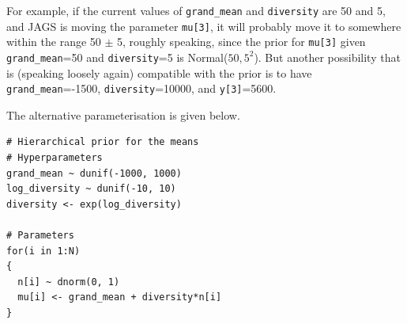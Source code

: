 For example, if the current values of {\tt grand\_mean} and {\tt diversity}
are 50 and 5, and JAGS is moving the parameter {\tt mu[3]}, it will probably
move it to somewhere within the range 50 $\pm$ 5, roughly speaking, since
the prior for {\tt mu[3]} given {\tt grand\_mean}=50 and {\tt diversity}=5
is Normal($50, 5^2$). But another possibility that is (speaking loosely again)
compatible with the prior is to have {\tt grand\_mean}=-1500,
{\tt diversity}=10000, and {\tt y[3]}=5600.


The alternative parameterisation is given below.

\begin{verbatim}
# Hierarchical prior for the means
# Hyperparameters
grand_mean ~ dunif(-1000, 1000)
log_diversity ~ dunif(-10, 10)
diversity <- exp(log_diversity)

# Parameters
for(i in 1:N)
{
  n[i] ~ dnorm(0, 1)
  mu[i] <- grand_mean + diversity*n[i]
}
\end{verbatim}

